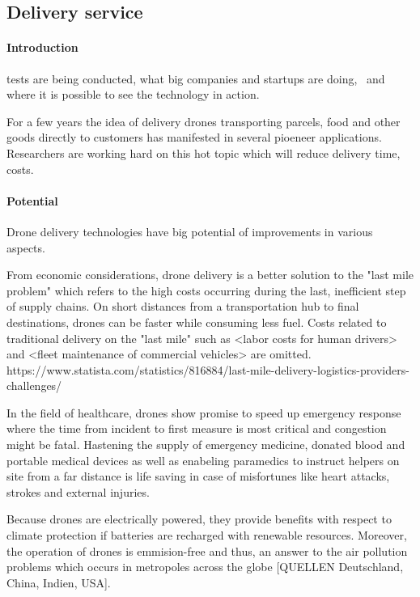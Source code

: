 \subsection{Delivery service} \cite{Watts2012}


\paragraph{Introduction}
tests are being conducted, 
what big companies and startups are doing, \
and where it is possible to see the technology in action.


For a few years the idea of 
delivery drones transporting parcels, food and other goods
directly to customers
has manifested in several pioeneer applications. 
Researchers are working hard on this hot topic
which will reduce delivery time,
costs.

\paragraph{Potential}
Drone delivery technologies have big potential
of improvements in various aspects.

From economic considerations,
drone delivery is a better solution to the "last mile problem"
which refers to the high costs occurring during the last, inefficient step of supply chains.
On short distances from a transportation hub to final destinations,
drones can be faster while consuming less fuel. Costs related
to traditional delivery on the "last mile" such as
<labor costs for human drivers> and <fleet maintenance of commercial vehicles>
are omitted.
https://www.statista.com/statistics/816884/last-mile-delivery-logistics-providers-challenges/

In the field of healthcare,
drones show promise to speed up emergency response
where the time from incident to first measure is 
most critical and 
congestion might be fatal.
Hastening the supply of emergency medicine,
donated blood and portable medical devices as well as
enabeling paramedics to instruct helpers on site from a far distance
is life saving in case of misfortunes like 
heart attacks, strokes and external injuries.

Because drones are electrically powered, they provide benefits
with respect to climate protection if batteries
are recharged with renewable resources. Moreover,
the operation of drones is emmision-free and thus,
an answer to the air pollution problems
which occurs in metropoles across the globe [QUELLEN Deutschland, China, Indien, USA].

